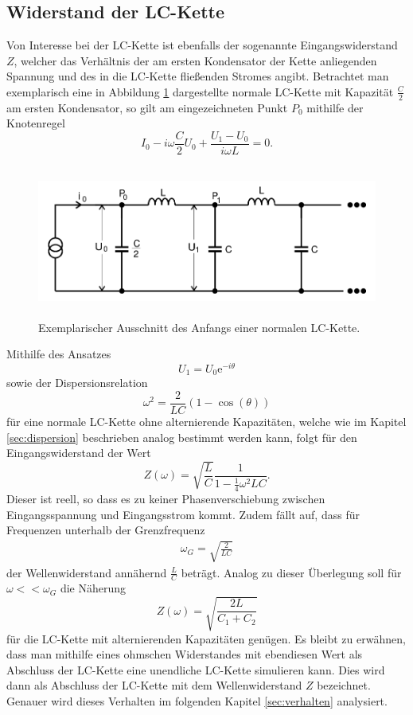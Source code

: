 \subsection{Widerstand der LC-Kette}
\label{sec:widerstand}
Von Interesse bei der LC-Kette ist ebenfalls der sogenannte Eingangswiderstand $Z$, welcher das Verhältnis der am ersten Kondensator der Kette anliegenden Spannung und des in die LC-Kette fließenden Stromes angibt.
Betrachtet man exemplarisch eine in Abbildung \ref{tfig:4} dargestellte normale LC-Kette mit Kapazität $\frac{C}{2}$ am ersten Kondensator, so gilt am eingezeichneten Punkt $P_0$ mithilfe der Knotenregel
\begin{equation}
  I_0 - i \omega \frac{C}{2} U_0 + \frac{U_1 - U_0}{i \omega L} = 0.
\end{equation}
\begin{figure}[H]
  \centering
  \includegraphics[height=5cm]{wellenwiderstand.png}
  \caption{Exemplarischer Ausschnitt des Anfangs einer normalen LC-Kette. \cite{sample}}
  \label{tfig:4}
\end{figure}
Mithilfe des Ansatzes
\begin{equation}
  U_1 = U_0 \mathrm{e}^{-i \theta}
\end{equation}
sowie der Dispersionsrelation
\begin{equation}
  \omega^2 = \frac{2}{LC} (1-\cos{(\theta)})
\end{equation}
für eine normale LC-Kette ohne alternierende Kapazitäten, welche wie im Kapitel \ref{sec:dispersion} beschrieben analog bestimmt werden kann, folgt für den Eingangswiderstand der Wert
\begin{equation}
Z(\omega) = \sqrt{\frac{L}{C}} \frac{1}{1 - \frac{1}{4} \omega^2 L C}.
\end{equation}
Dieser ist reell, so dass es zu keiner Phasenverschiebung zwischen Eingangsspannung und Eingangsstrom kommt.
Zudem fällt auf, dass für Frequenzen unterhalb der Grenzfrequenz
\begin{align*}
  \omega_G = \sqrt{\frac{2}{LC}}
\end{align*}
der Wellenwiderstand annähernd $\frac{L}{C}$ beträgt.
Analog zu dieser Überlegung soll für $\omega << \omega_G$ die Näherung
\begin{equation}
  \label{eqn:irgendwas}
  Z(\omega) = \sqrt{\frac{2L}{C_1 + C_2}}
\end{equation}
für die LC-Kette mit alternierenden Kapazitäten genügen.
Es bleibt zu erwähnen, dass man mithilfe eines ohmschen Widerstandes mit ebendiesen Wert als Abschluss der LC-Kette eine unendliche LC-Kette simulieren kann.
Dies wird dann als Abschluss der LC-Kette mit dem Wellenwiderstand $Z$ bezeichnet.
Genauer wird dieses Verhalten im folgenden Kapitel \ref{sec:verhalten} analysiert.
